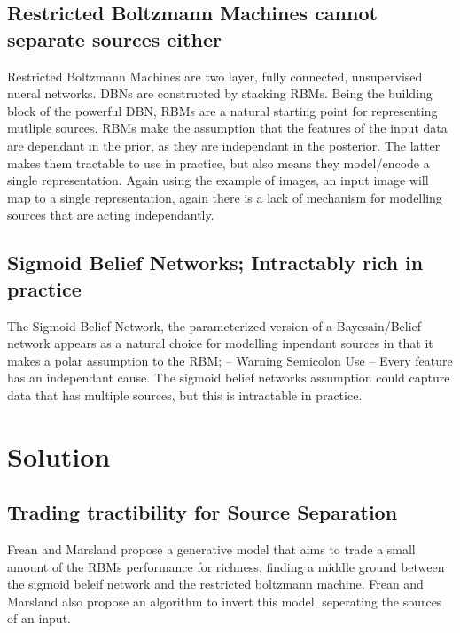 \subsection{Restricted Boltzmann Machines cannot separate sources either}
Restricted Boltzmann Machines are two layer, fully connected, unsupervised nueral networks. DBNs are constructed by stacking RBMs. Being the building block of the powerful DBN, RBMs are a natural starting point for representing mutliple sources.
RBMs make the assumption that the features of the input data are dependant in the prior, as they are independant in the posterior. The latter makes them tractable to use in practice, but also means they model/encode a single representation.
  Again using the example of images, an input image will map to a single representation, again there is a lack of mechanism for modelling sources that are acting independantly.

\subsection{Sigmoid Belief Networks; Intractably rich in practice}
The Sigmoid Belief Network, the parameterized version of a Bayesain/Belief network appears as a natural choice for modelling inpendant sources in that it makes a polar assumption to the RBM; -- Warning Semicolon Use -- Every feature has an independant cause. The sigmoid belief networks assumption could capture data that has multiple sources, but this is intractable in practice.

\section{Solution}
\subsection{Trading tractibility for Source Separation}
Frean and Marsland propose a generative model that aims to trade a small amount of the RBMs performance for richness, finding a middle ground between the sigmoid beleif network and the restricted boltzmann machine.
Frean and Marsland also propose an algorithm to invert this model, seperating the sources of an input.

